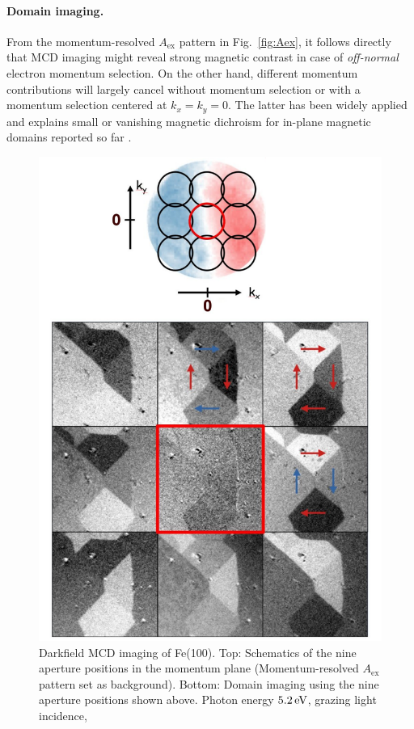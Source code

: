 \documentclass[prl,twocolumn,floatfix]{revtex4-2}
\newcommand{\rework}[1]{{\color{blue}{#1}}}
\begin{document}
\paragraph{Domain imaging.} 

From the momentum-resolved $A_{\mathrm{ex}}$ pattern in Fig.~\ref{fig:Aex}, it follows directly that MCD imaging might reveal strong magnetic contrast in case of \textit{off-normal} electron momentum selection. On the other hand, different momentum contributions will largely cancel without momentum selection or with a momentum selection centered at $k_x=k_y=0$. The latter has been widely applied and explains small or vanishing magnetic dichroism for in-plane magnetic domains reported so far \cite{marx2000}.
\begin{figure}
    \centering
    \includegraphics[width = 0.7\columnwidth]{Darkfield_overview.pdf}
    \caption{Darkfield MCD imaging of Fe(100). Top: Schematics of the nine aperture positions in the momentum plane (Momentum-resolved $A_{\mathrm{ex}}$ pattern set as background). Bottom: Domain imaging using the nine aperture positions shown above. Photon energy $\unit[5.2]{eV}$, grazing light incidence, \rework{binding energy $\unit[xx]{eV}$.}}
    \label{fig:Imaging}
\end{figure}
\end{document}
